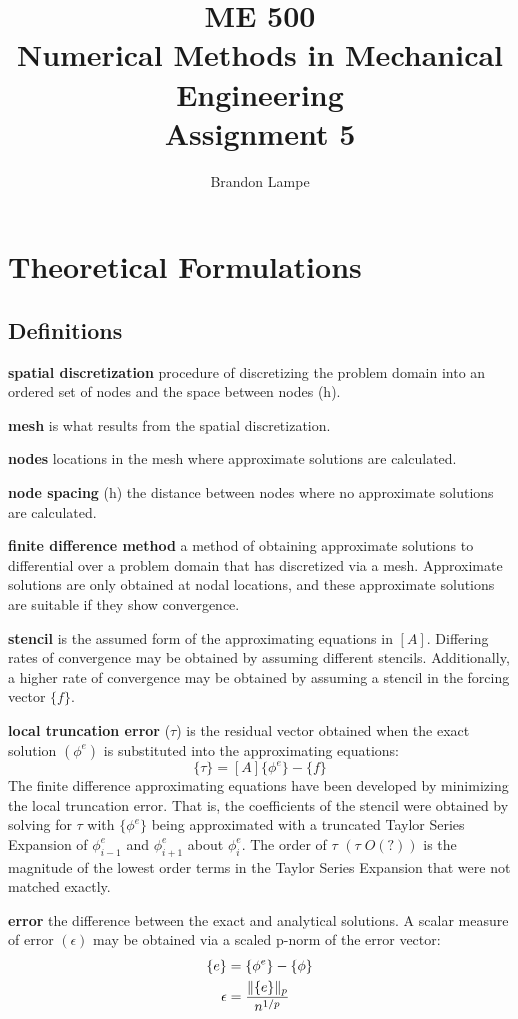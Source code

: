 \documentclass[letterpaper, 10pt, oneside]{article}
\title{ME 500\\ Numerical Methods in Mechanical Engineering\\ Assignment 5}
\author{Brandon Lampe}
\newenvironment{dd}[1]{
	\noindent
	\textbf{\normalsize{#1}}
	\hspace{0.1in}
	\small
	\rmfamily
	}
	{\medskip}
\newcommand{\as}[1]{\begin{align*}#1\end{align*}}
\newcommand{\bdd}{\begin{dd}}
\newcommand{\edd}{\end{dd}}
\DeclarePairedDelimiter\norm{\lVert}{\rVert}%
\begin{document}
\maketitle
\section{Theoretical Formulations}
\subsection{Definitions}
\bdd{spatial discretization} procedure of discretizing the problem domain into an ordered set of nodes and the space between nodes (h).
\edd

\bdd{mesh} is what results from the spatial discretization.
\edd

\bdd{nodes} locations in the mesh where approximate solutions are calculated.
\edd

\bdd{node spacing} (h) the distance between nodes where no approximate solutions are calculated.
\edd

\bdd{finite difference method} a method of obtaining approximate solutions to differential over a problem domain that has discretized via a mesh.  Approximate solutions are only obtained at nodal locations, and these approximate solutions are suitable if they show convergence.
\edd

\bdd{stencil} is the assumed form of the approximating equations in $[A]$.  Differing rates of convergence may be obtained by assuming different stencils.  Additionally, a higher rate of convergence may be obtained by assuming a stencil in the forcing vector $\{f\}$.
\edd

\bdd{local truncation error} ($\tau$) is the residual vector obtained when the exact solution $(\phi^e)$ is substituted into the approximating equations: $$ \{\tau\} = [A]\{\phi^e\} - \{f\}$$
The finite difference approximating equations have been developed by minimizing the local truncation error. That is, the coefficients of the stencil were obtained by solving for $\tau$ with $\{\phi^e\}$ being approximated with a truncated Taylor Series Expansion of $\phi_{i-1}^e$ and $\phi_{i+1}^e$ about $\phi_{i}^e$. The order of $\tau$ $(\tau \; O(?))$ is the magnitude of the lowest order terms in the Taylor Series Expansion that were not matched exactly.
\edd

\bdd{error} the difference between the exact and analytical solutions.  A scalar measure of error $(\epsilon)$ may be obtained via a scaled p-norm of the error vector:
\as{
	\{e\} &= \{\phi^e\} - \{\phi\} \\ 
	\epsilon &= \frac{\norm{\{e\}}_p}{n^{1/p}}}
\edd
\end{document}
